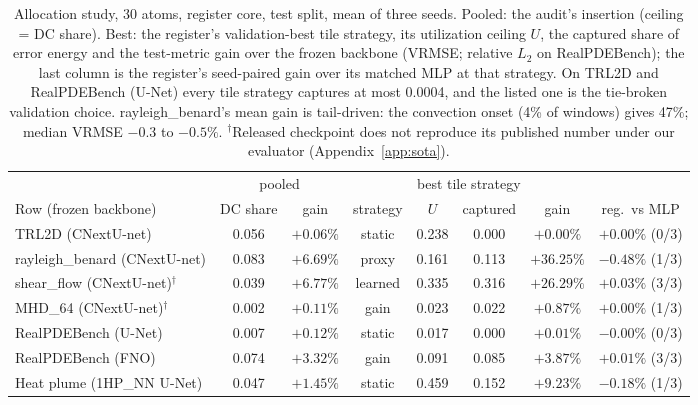 \documentclass{article}
\begin{document}
\begin{table}[t]
\centering
\caption{Allocation study, 30 atoms, register core, test split, mean of three seeds. Pooled: the audit's insertion
(ceiling = DC share). Best: the register's validation-best tile strategy, its utilization ceiling $U$, the captured
share of error energy and the test-metric gain over the frozen backbone (VRMSE; relative $L_2$ on RealPDEBench); the last
column is the register's seed-paired gain over its matched MLP at that strategy. On TRL2D and RealPDEBench (U-Net) every
tile strategy captures at most 0.0004, and the listed one is the tie-broken validation choice. rayleigh\_benard's mean
gain is tail-driven: the convection onset (4\% of windows) gives 47\%; median VRMSE $-0.3$ to $-0.5\%$. $^\dagger$Released checkpoint does not
reproduce its published number under our evaluator (Appendix~\ref{app:sota}).}
\label{tab:alloc}
\footnotesize
\setlength{\tabcolsep}{3pt}
\begin{tabular}{lccccccc}
\toprule
 & \multicolumn{2}{c}{pooled} & \multicolumn{4}{c}{best tile strategy} & \\
\cmidrule(lr){2-3}\cmidrule(lr){4-7}
Row (frozen backbone) & DC share & gain & strategy & $U$ & captured & gain & reg.\ vs MLP \\
\midrule
TRL2D (CNextU-net) & 0.056 & $+0.06\%$ & static & 0.238 & 0.000 & $+0.00\%$ & $+0.00\%$ (0/3) \\
rayleigh\_benard (CNextU-net) & 0.083 & $+6.69\%$ & proxy & 0.161 & 0.113 & $+36.25\%$ & $-0.48\%$ (1/3) \\
shear\_flow (CNextU-net)$^\dagger$ & 0.039 & $+6.77\%$ & learned & 0.335 & 0.316 & $+26.29\%$ & $+0.03\%$ (3/3) \\
MHD\_64 (CNextU-net)$^\dagger$ & 0.002 & $+0.11\%$ & gain & 0.023 & 0.022 & $+0.87\%$ & $+0.00\%$ (1/3) \\
RealPDEBench (U-Net) & 0.007 & $+0.12\%$ & static & 0.017 & 0.000 & $+0.01\%$ & $-0.00\%$ (0/3) \\
RealPDEBench (FNO) & 0.074 & $+3.32\%$ & gain & 0.091 & 0.085 & $+3.87\%$ & $+0.01\%$ (3/3) \\
Heat plume (1HP\_NN U-Net) & 0.047 & $+1.45\%$ & static & 0.459 & 0.152 & $+9.23\%$ & $-0.18\%$ (1/3) \\
\bottomrule
\end{tabular}
\end{table}
\end{document}

